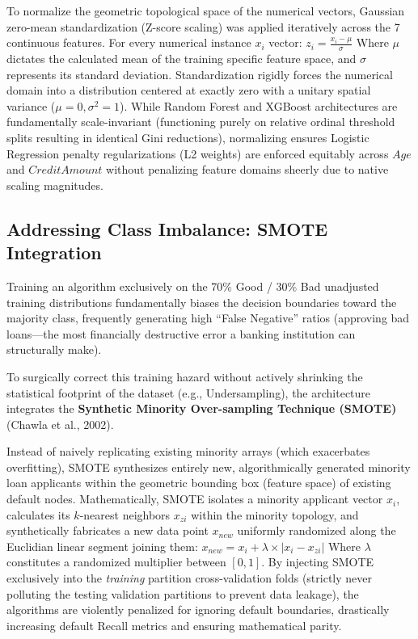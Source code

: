 To normalize the geometric topological space of the numerical vectors,
Gaussian zero-mean standardization (Z-score scaling) was applied
iteratively across the 7 continuous features. For every numerical
instance \(x_i\) vector: \(z_i = \frac{x_i - \mu}{\sigma}\) Where
\(\mu\) dictates the calculated mean of the training specific feature
space, and \(\sigma\) represents its standard deviation. Standardization
rigidly forces the numerical domain into a distribution centered at
exactly zero with a unitary spatial variance (\(\mu=0, \sigma^2=1\)).
While Random Forest and XGBoost architectures are fundamentally
scale-invariant (functioning purely on relative ordinal threshold splits
resulting in identical Gini reductions), normalizing ensures Logistic
Regression penalty regularizations (L2 weights) are enforced equitably
across \(Age\) and \(Credit Amount\) without penalizing feature domains
sheerly due to native scaling magnitudes.

\hypertarget{addressing-class-imbalance-smote-integration}{%
\subsection{Addressing Class Imbalance: SMOTE
Integration}\label{addressing-class-imbalance-smote-integration}}

Training an algorithm exclusively on the 70\% Good / 30\% Bad unadjusted
training distributions fundamentally biases the decision boundaries
toward the majority class, frequently generating high ``False Negative''
ratios (approving bad loans---the most financially destructive error a
banking institution can structurally make).

To surgically correct this training hazard without actively shrinking
the statistical footprint of the dataset (e.g., Undersampling), the
architecture integrates the \textbf{Synthetic Minority Over-sampling
Technique (SMOTE)} (Chawla et al., 2002).

Instead of naively replicating existing minority arrays (which
exacerbates overfitting), SMOTE synthesizes entirely new,
algorithmically generated minority loan applicants within the geometric
bounding box (feature space) of existing default nodes. Mathematically,
SMOTE isolates a minority applicant vector \(x_i\), calculates its
\(k\)-nearest neighbors \(x_{zi}\) within the minority topology, and
synthetically fabricates a new data point \(x_{new}\) uniformly
randomized along the Euclidian linear segment joining them:
\(x_{new} = x_i + \lambda \times |x_i - x_{zi}|\) Where \(\lambda\)
constitutes a randomized multiplier between \([0, 1]\). By injecting
SMOTE exclusively into the \emph{training} partition cross-validation
folds (strictly never polluting the testing validation partitions to
prevent data leakage), the algorithms are violently penalized for
ignoring default boundaries, drastically increasing default Recall
metrics and ensuring mathematical parity.

